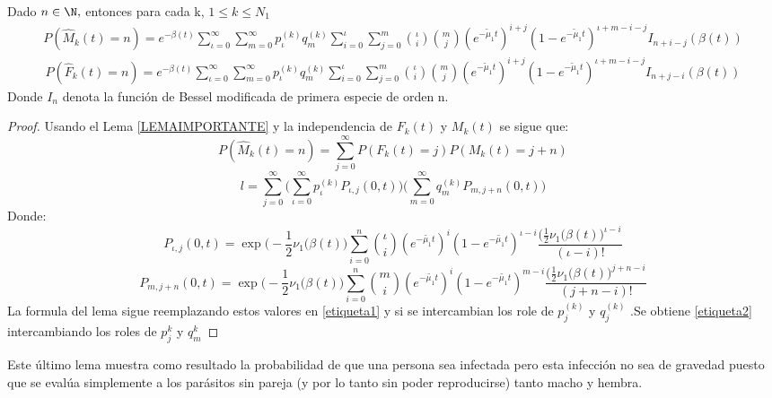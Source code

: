 \label{LEMAIMPORTANTE}
\begin{Lem}
    Dado $n\in\N,$ entonces para cada k, $1\leq k\leq N_1$
    \begin{eqnarray}
        P(\hat{M}_k(t)=n)=e^{-\beta(t)}\sum_{\iota=0}^\infty\sum_{m=0}^\infty p_{\iota}^{(k)} q_m^{(k)}\sum_{i=0}^\iota\sum_{j=0}^m{\iota\choose i}{m\choose j} (e^{-\tilde{\mu}_1t})^{i+j}(1-e^{-\tilde{\mu}_1t})^{\iota+m-i-j}I_{n+i-j}(\beta(t))
        \label{etiqueta1}
    \end{eqnarray}
    \begin{eqnarray}
        P(\hat{F}_k(t)=n)=e^{-\beta(t)}\sum_{\iota=0}^\infty\sum_{m=0}^\infty p_{\iota}^{(k)} q_m^{(k)}\sum_{i=0}^\iota\sum_{j=0}^m{\iota\choose i}{m\choose j} (e^{-\tilde{\mu}_1t})^{i+j}(1-e^{-\tilde{\mu}_1t})^{\iota+m-i-j}I_{n+j-i}(\beta(t))
        \label{etiqueta2}
    \end{eqnarray}
    Donde $I_n$ denota la función de Bessel modificada de primera especie de orden n.
    \begin{proof}
        Usando el Lema \ref{LEMAIMPORTANTE} y la independencia de $F_k(t)$ y $M_k(t)$ se sigue que:
        $$P(\hat{M}_k(t)=n)=\sum_{j=0}^\infty P(F_k(t)=j)P(M_k(t)=j+n)$$
        $$l=\sum_{j=0}^\infty \big(\sum_{\iota=0}^\infty p_{\iota}^{(k)} P_{\iota ,j}(0,t) \big)\big(\sum_{m=0}^\infty q_m^{(k)}P_{m,j+n}(0,t)\big)$$
        Donde:
        $$P_{\iota ,j}(0,t)=\exp\big(-\frac{1}{2}\nu_1(\beta(t)\big)\sum_{i=0}^n{\iota \choose i}(e^{-\tilde{\mu_1}t})^i(1-e^{-\tilde{\mu_1}t})^{\iota-i}\frac{\big(\frac{1}{2}\nu_1(\beta(t)\big)^{\iota-i}}{(\iota-i)!}$$
        $$P_{m ,j+n}(0,t)=\exp\big(-\frac{1}{2}\nu_1(\beta(t)\big)\sum_{i=0}^n{m \choose i}(e^{-\tilde{\mu_1}t})^i(1-e^{-\tilde{\mu_1}t})^{m-i}\frac{\big(\frac{1}{2}\nu_1(\beta(t)\big)^{j+n-i}}{(j+n-i)!}$$
        La formula del lema sigue reemplazando estos valores en \ref{etiqueta1} y si se intercambian los role de $p_j^{(k)}$ y $q_j^{(k)}$ .Se obtiene \ref{etiqueta2} intercambiando los roles de $p_j^{k}$ y $q_m^{k}$
    \end{proof}
    Este último lema muestra como resultado la probabilidad de que una persona sea infectada pero esta infección no sea de gravedad puesto que se evalúa simplemente a los parásitos sin pareja (y por lo tanto sin poder reproducirse) tanto macho y hembra.
\end{Lem}